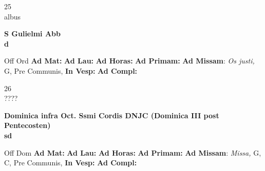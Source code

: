 \documentclass[10pt, openany]{book}
\begin{document}
    \begin{center}
        \begin{minipage}{3.5in}
            \vspace{2em}
            \begin{minipage}{0.5in}
                {\Huge 25} \\
                {\normalsize albus}
            \end{minipage}
            \begin{minipage}{3.0in}
                \textbf{ \large S Gulielmi Abb \\
                \textnormal{\normalsize d}}

            \end{minipage}
            \begin{justify}Off Ord
                \textbf{Ad Mat: }
                \textbf{Ad Lau: }
                \textbf{Ad Horas: }
                \textbf{Ad Primam: }\textbf{Ad Missam}: \textit{Os justi,} G, Pre Communis, 
                \textbf{In Vesp: }
                \textbf{Ad Compl: }
            \end{justify}
        \end{minipage}
    \end{center}

    \begin{center}
        \begin{minipage}{3.5in}
            \vspace{2em}
            \begin{minipage}{0.5in}
                {\Huge 26} \\
                {\normalsize ????}
            \end{minipage}
            \begin{minipage}{3.0in}
                \textbf{ \large Dominica infra Oct. Ssmi Cordis DNJC (Dominica III post Pentecosten) \\
                \textnormal{\normalsize sd}}

            \end{minipage}
            \begin{justify}Off Dom
                \textbf{Ad Mat: }
                \textbf{Ad Lau: }
                \textbf{Ad Horas: }
                \textbf{Ad Primam: }\textbf{Ad Missam}: \textit{Missa,} G, C, Pre Communis, 
                \textbf{In Vesp: }
                \textbf{Ad Compl: }
            \end{justify}
        \end{minipage}
    \end{center}
\end{document}
